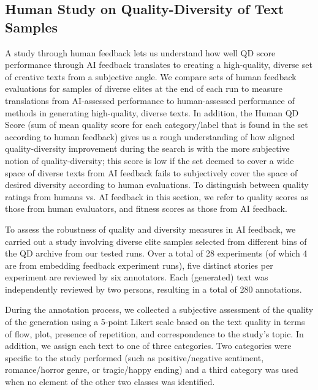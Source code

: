\subsection{Human Study on Quality-Diversity of Text Samples}\label{app:human_study_setup}
A study through human feedback lets us understand how well QD score performance through AI feedback translates to creating a high-quality, diverse set of creative texts from a subjective angle. We compare sets of human feedback evaluations for samples of diverse elites at the end of each run to measure translations from AI-assessed performance to human-assessed performance of methods in generating high-quality, diverse texts. In addition, the Human QD Score (sum of mean quality score for each category/label that is found in the set according to human feedback) gives us a rough understanding of how aligned quality-diversity improvement during the search is with the more subjective notion of quality-diversity; this score is low if the set deemed to cover a wide space of diverse texts from AI feedback fails to subjectively cover the space of desired diversity according to human evaluations. To distinguish between quality ratings from humans vs. AI feedback in this section, we refer to quality scores as those from human evaluators, and fitness scores as those from AI feedback.

To assess the robustness of quality and diversity measures in AI feedback, we carried out a study involving diverse elite samples selected from different bins of the QD archive from our tested runs. Over a total of 28 experiments (of which 4 are from embedding feedback experiment runs), five distinct stories per experiment are reviewed by six annotators. Each (generated) text was independently reviewed by two persons, resulting in a total of 280 annotations. 

During the annotation process, we collected a subjective assessment of the quality of the generation using a 5-point Likert scale based on the text quality in terms of flow, plot, presence of repetition, and correspondence to the study's topic. In addition, we assign each text to one of three categories. Two categories were specific to the study performed (such as positive/negative sentiment, romance/horror genre, or tragic/happy ending) and a third category was used when no element of the other two classes was identified.

